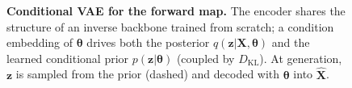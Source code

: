 \documentclass[letterpaper, 12, one column]{article}
\begin{document}
\begin{figure}[H]
{}
\caption{\textbf{Conditional VAE for the forward map.} The encoder shares the structure of an inverse backbone trained from scratch; a condition embedding of $\boldsymbol{\theta}$ drives both the posterior $q(\mathbf{z}|\mathbf{X},\boldsymbol{\theta})$ and the learned conditional prior $p(\mathbf{z}|\boldsymbol{\theta})$ (coupled by $D_{\mathrm{KL}}$). At generation, $\mathbf{z}$ is sampled from the prior (dashed) and decoded with $\boldsymbol{\theta}$ into $\hat{\mathbf{X}}$.}
\label{fig:cvae_diagram}
\end{figure}
\end{document}
